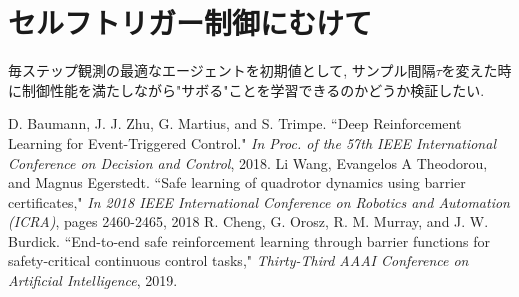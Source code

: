 \documentclass{jsarticle}
\begin{document}
\section{セルフトリガー制御にむけて}
毎ステップ観測の最適なエージェントを初期値として, サンプル間隔$\tau$を変えた時に制御性能を満たしながら"サボる"ことを学習できるのかどうか検証したい. 



\begin{thebibliography}{10}
D. Baumann, J. J. Zhu, G. Martius, and S. Trimpe. “Deep Reinforcement Learning for Event-Triggered Control."  \textit{In Proc. of the 57th IEEE International Conference on Decision and Control}, 2018.
Li Wang, Evangelos A Theodorou, and Magnus Egerstedt. “Safe learning of quadrotor dynamics using barrier certificates," \textit{In 2018 IEEE International Conference on Robotics and Automation (ICRA)}, pages 2460-2465, 2018
R. Cheng, G. Orosz, R. M. Murray, and J. W. Burdick.  “End-to-end safe reinforcement learning through barrier functions for safety-critical continuous control tasks," \textit{Thirty-Third AAAI Conference on Artificial Intelligence}, 2019.

\end{thebibliography}

 
\end{document}
